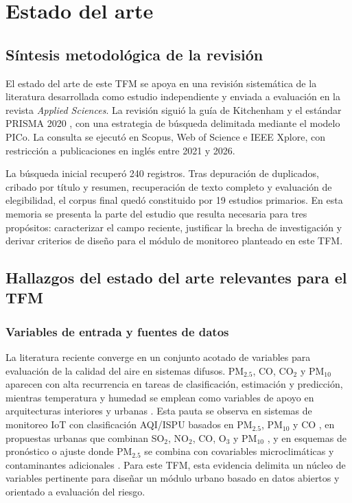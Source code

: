 \section{Estado del arte}
\label{sec:resultados_revision}
\subsection{Síntesis metodológica de la revisión}
El estado del arte de este TFM se apoya en una revisión sistemática de la literatura desarrollada como estudio independiente y enviada a evaluación en la revista \textit{Applied Sciences}. La revisión siguió la guía de Kitchenham \cite{kitchenham2007} y el estándar PRISMA 2020 \cite{prisma2020}, con una estrategia de búsqueda delimitada mediante el modelo PICo. La consulta se ejecutó en Scopus, Web of Science e IEEE Xplore, con restricción a publicaciones en inglés entre 2021 y 2026.

La búsqueda inicial recuperó 240 registros. Tras depuración de duplicados, cribado por título y resumen, recuperación de texto completo y evaluación de elegibilidad, el corpus final quedó constituido por 19 estudios primarios. En esta memoria se presenta la parte del estudio que resulta necesaria para tres propósitos: caracterizar el campo reciente, justificar la brecha de investigación y derivar criterios de diseño para el módulo de monitoreo planteado en este TFM.

\subsection{Hallazgos del estado del arte relevantes para el TFM}
\subsubsection{Variables de entrada y fuentes de datos}
La literatura reciente converge en un conjunto acotado de variables para evaluación de la calidad del aire en sistemas difusos. PM$_{2.5}$, CO, CO$_2$ y PM$_{10}$ aparecen con alta recurrencia en tareas de clasificación, estimación y predicción, mientras temperatura y humedad se emplean como variables de apoyo en arquitecturas interiores y urbanas \cite{ART06,ART07,A028,A135,A165,A167}. Esta pauta se observa en sistemas de monitoreo IoT con clasificación AQI/ISPU basados en PM$_{2.5}$, PM$_{10}$ y CO \cite{ART06}, en propuestas urbanas que combinan SO$_2$, NO$_2$, CO, O$_3$ y PM$_{10}$ \cite{ART07}, y en esquemas de pronóstico o ajuste donde PM$_{2.5}$ se combina con covariables microclimáticas y contaminantes adicionales \cite{A084,A135}. Para este TFM, esta evidencia delimita un núcleo de variables pertinente para diseñar un módulo urbano basado en datos abiertos y orientado a evaluación del riesgo.

